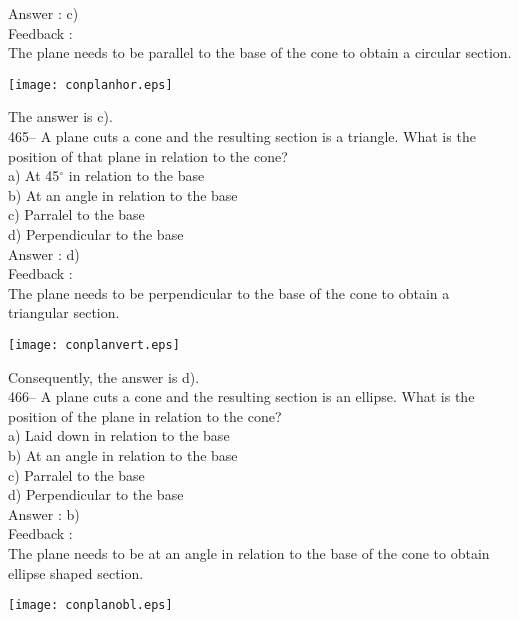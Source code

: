 ﻿\documentclass[letterpaper, 12pt]{article}
\begin{document}
Answer : c)\\

Feedback : \\
The plane needs to be parallel to the base of the cone to obtain a circular section.
    \begin{center}
    \texttt{[image: conplanhor.eps]}
    \end{center}

The answer is c).\\

465-- A plane cuts a cone and the resulting section is a triangle. What is the position of that plane in relation to the cone?\\
a) At 45$^{\circ}$ in relation to the base\\
b) At an angle in relation to the base\\
c) Parralel to the base\\
d) Perpendicular to the base\\

Answer : d)\\

Feedback : \\
The plane needs to be perpendicular to the base of the cone to obtain a triangular section.
    \begin{center}
    \texttt{[image: conplanvert.eps]}
    \end{center}

Consequently, the answer is d).\\


466-- A plane cuts a cone and the resulting section is an ellipse. What is the position of the plane in relation to the cone?\\
a) Laid down in relation to the base\\
b) At an angle in relation to the base\\
c) Parralel to the base\\
d) Perpendicular to the base\\

Answer : b)\\

Feedback : \\
The plane needs to be at an angle in relation to the base of the cone to obtain ellipse shaped section.
    \begin{center}
    \texttt{[image: conplanobl.eps]}
    \end{center}
\end{document}
